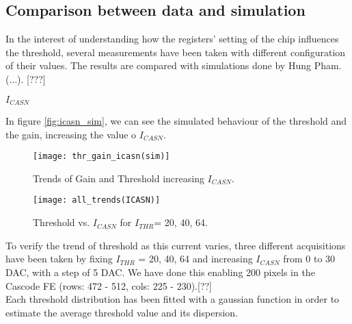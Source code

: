 \begin{comment}
pag.97 tesi
This modification has significant consequences in several design aspects such as the bandwidth, gain, noise and threshold dispersion resulting in a different front-end behavior
\end{comment}


\subsection{Comparison between data and simulation}

In the interest of understanding how the registers' setting of the chip influences the threshold, several measurements have been taken with different configuration of their values.
The results are compared with simulations done by Hung Pham.  (...). [???]

\begin{description}
\item[\textbf{$I_{CASN}$}] 
\end{description}

In figure \vref{fig:icasn_sim}, we can see the simulated behaviour of the threshold and the gain, increasing the value o $I_{CASN}$.

\begin{figure}[h!]
\centering
\texttt{[image: thr\_gain\_icasn(sim)]}
\caption{Trends of Gain and Threshold increasing $I_{CASN}$.}
\label{fig:icasn_sim}
\end{figure}

\begin{figure}[h!]
\centering
\texttt{[image: all\_trends(ICASN)]}
\caption{Threshold vs. $I_{CASN}$ for $I_{THR}$= 20, 40, 64.}
\label{fig:alltrends_icasn}
\end{figure}

To verify the trend of threshold as this current varies, three different acquisitions have been taken by fixing $I_{THR}$ = 20, 40, 64 and increasing $I_{CASN}$ from 0  to 30 DAC, with a step of 5 DAC. We have done this enabling 200 pixels in the Cascode FE (rows: 472 - 512, cols: 225 - 230).[??]\\

Each threshold distribution has been fitted with a gaussian function in order to estimate the average threshold value and its dispersion.


